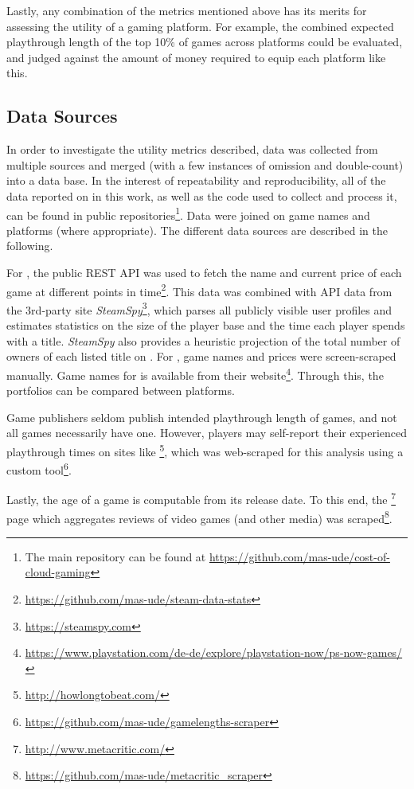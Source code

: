 Lastly, any combination of the metrics mentioned above has its
merits for assessing the utility of a gaming platform. For example,
the combined expected playthrough length of the top 10\% of games
across platforms could be evaluated, and judged against the amount
of money required to equip each platform like this.


\subsection{Data Sources}
In order to investigate the utility metrics described, data was collected from
multiple sources and merged (with a few instances of omission and
double-count) into a data base. In the interest of repeatability and
reproducibility, all of the data reported on in this work, as well as
the code used to collect and process it, can be found in public
repositories\footnote{The main repository can be found at
\url{https://github.com/mas-ude/cost-of-cloud-gaming}}.
Data were joined on game names and platforms (where appropriate).
The different data sources are described in the following.

For \steam, the public \acrshort{REST} \acrshort{API} was used to
fetch the name and current price of each game at different points in
time\footnote{\url{https://github.com/mas-ude/steam-data-stats}}. This
data was combined with \acrshort{API} data from the 3rd-party site
\textit{SteamSpy}\footnote{\url{https://steamspy.com}}, which parses all
publicly visible \steam user profiles and
estimates statistics on the size of the player base and the time each
player spends with a title. \textit{SteamSpy} also provides a heuristic
projection of the total number of owners of each listed title on \steam.
For \gfnow, game names and prices were screen-scraped manually.
Game names for \psnow is available from their website\footnote{\url{https://www.playstation.com/de-de/explore/playstation-now/ps-now-games/}}.
Through this, the portfolios can be compared between platforms.

Game publishers seldom publish intended playthrough
length of games, and not all games necessarily have one. However, players
may self-report their experienced playthrough times on sites like
\hltb\footnote{\url{http://howlongtobeat.com/}}, which was web-scraped
for this analysis using a custom tool\footnote{\url{https://github.com/mas-ude/gamelengths-scraper}}.


Lastly, the age of a game is computable from its release date. To this end, the
\metacritic\footnote{\url{http://www.metacritic.com/}} page which
aggregates reviews of video games (and other media) was
scraped\footnote{\url{https://github.com/mas-ude/metacritic_scraper}}.

